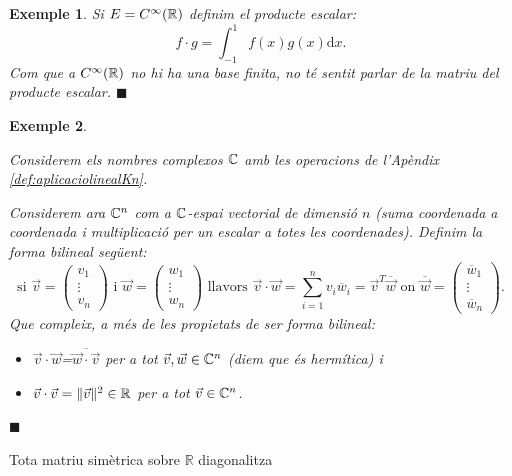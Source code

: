 \documentclass[
  11pt,
]{book}
\makeatletter
\numberwithin{dummy}{section}
\theoremstyle{maincolornumbox}
\theoremstyle{blacknumex}
\newtheorem{exampleT}{Exemple}[chapter]
\theoremstyle{blacknumbox}
\theoremstyle{maincolornum}
\newenvironment{example}{\begin{exampleT}}{\hfill{\tiny\ensuremath{\blacksquare}}\end{exampleT}}
\renewcommand{\section}{\@startsection{section}{1}{\z@}
{-4ex \@plus -1ex \@minus -.4ex}
{1ex \@plus.2ex }
{\normalfont\large\sffamily\bfseries}}
\newlength\esp
\makeatother
\begin{document}
\begin{example}
Si \(E=C^\infty(\mathbb{R})\) definim el producte escalar:
\[f\cdot g = \int_{-1}^1 f(x)g(x)\mathrm{d}x .\] Com que a
\(C^\infty(\mathbb{R})\) no hi ha una base finita, no té sentit parlar de la
matriu del producte escalar.
\end{example}

\begin{example}
\protect\hypertarget{exm:complexos}{}\label{exm:complexos}

Considerem els nombres
complexos \(\mathbb{C}\) amb les operacions de
l'Apèndix \ref{def:aplicaciolinealKn}.

Considerem ara \(\mathbb{C}^n\) com a \(\mathbb{C}\)-espai vectorial de dimensió \(n\) (suma
coordenada a coordenada i multiplicació per un escalar a totes les
coordenades). Definim la forma bilineal següent: \[\text{si }
\vec v=\begin{pmatrix}
v_1 \\ \vdots \\ v_n
\end{pmatrix}
\text{ i }
\vec w=\begin{pmatrix}
w_1 \\ \vdots \\ w_n
\end{pmatrix}
\text{ llavors }
\vec v\cdot \vec w= \sum_{i=1}^n v_i\overline{w}_i=\vec v^T \overline{\vec w} \text{ on }
\overline{\vec w}=\begin{pmatrix}
\overline w_1 \\ \vdots \\ \overline w_n
\end{pmatrix}.\] Que compleix, a més de les propietats de ser forma
bilineal:

\begin{itemize}
\item
  \(\vec v\cdot \vec w\)=\(\overline{\vec w\cdot \vec v}\) per a tot
  \(\vec v,\vec w\in \mathbb{C}^n\) (diem que és hermítica) i
\item
  \(\vec v\cdot \vec v=\|\vec v\|^2\in \mathbb{R}\) per a tot \(\vec v\in\mathbb{C}^n\).
\end{itemize}

\end{example}

\section{\texorpdfstring{Tota matriu simètrica sobre \(\mathbb{R}\) diagonalitza}{Tota matriu simètrica sobre \textbackslash mathbb\{R\} diagonalitza}}\label{tota-matriu-simuxe8trica-sobre-mathbbr-diagonalitza}
\end{document}
